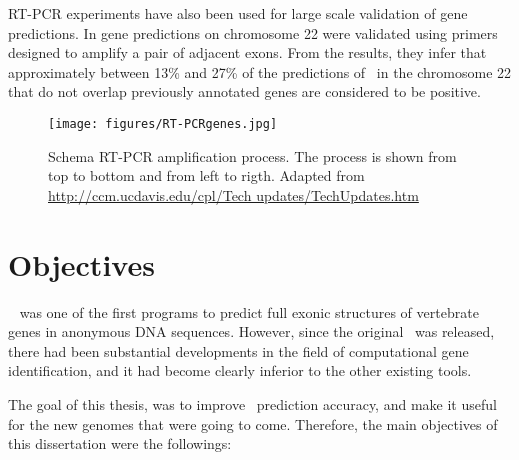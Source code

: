RT-PCR experiments have also been used for large scale validation of
gene predictions. In \cite{das:2001a} gene predictions on chromosome
22 were validated using primers designed to amplify a pair of adjacent
exons. From the results, they infer that approximately between 13\%
and 27\% of the predictions of \genscan\ in the chromosome 22 that do
not overlap previously annotated genes are considered to be positive.
 


\begin{figure}
\begin{center}
\texttt{[image: figures/RT-PCRgenes.jpg]}
\caption{Schema RT-PCR amplification process. The process is shown 
from top to bottom and from left to rigth. Adapted from
\url{http://ccm.ucdavis.edu/cpl/Tech updates/TechUpdates.htm}}\label{rtpcr}
\end{center}
\end{figure}


\newpage


\chapter{Objectives} 

\geneid\ \citep{guigo:1992a} was one of the first programs to predict
full exonic structures of vertebrate genes in anonymous DNA
sequences. However, since the original \geneid\ was released, there
had been substantial developments in the field of computational gene
identification, and it had become clearly inferior to the other
existing tools.

The goal of this thesis, was to improve \geneid\ prediction accuracy,
and make it useful for the new genomes that were going to
come. Therefore, the main objectives of this dissertation were the
followings:

